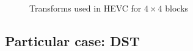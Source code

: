 \documentclass[11pt,a4paper,openright,twoside]{book}
\numberwithin{equation}{section} %
\begin{document}
\begin{figure}[tb]
	\centering
	\hspace{0.2\linewidth}
	\caption{Transforms used in \ac{HEVC} for $4\times4$ blocks}
	\label{fig:part_orig_pred_res_image}
\end{figure}

\subsection{Particular case: \acs{DST}}
\label{sub:particular_case_dst}
\end{document}
